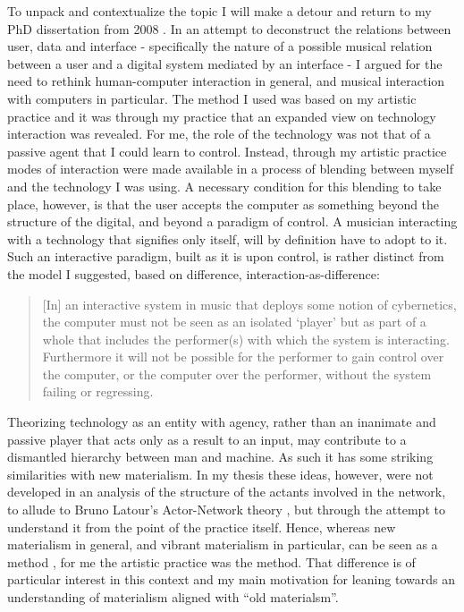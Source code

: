 \documentclass[11pt,a4paper]{article}
\begin{document}
To unpack and contextualize the topic I will make a detour and return to my PhD dissertation from 2008 \citep{frisk08phd}. In an attempt to deconstruct the relations between user, data and interface - specifically the nature of a possible musical relation between a user and a digital system mediated by an interface - I argued for the need to rethink human-computer interaction in general, and musical interaction with computers in particular. The method I used was based on my artistic practice and it was through my practice that an expanded view on technology interaction was revealed. For me, the role of the technology was not that of a passive agent that I could learn to control. Instead, through my artistic practice modes of interaction were made available in a process of blending between myself and the technology I was using.
A necessary condition for this blending to take place, however, is that the user accepts the computer as something beyond the structure of the digital, and beyond a paradigm of control. A musician interacting with a technology that signifies only itself, will by definition have to adopt to it. Such an interactive paradigm, built as it is upon control, is rather distinct from the model I suggested, based on difference, interaction-as-difference:
\begin{quote}
  [In] an interactive system in music that deploys some notion of cybernetics, the computer must not be seen as an isolated ‘player’ but as part of a whole that includes the performer(s) with which the system is interacting. Furthermore it will not be possible for the performer to gain control over the computer, or the computer over the performer, without the system failing or regressing. \citep[p. 98]{frisk08phd}
\end{quote}


Theorizing technology as an entity with agency, rather than an inanimate and passive player that acts only as a result to an input, may contribute to a dismantled hierarchy between man and machine. As such it has some striking similarities with new materialism. In my thesis these ideas, however, were not developed in an analysis of the structure of the actants involved in the network, to allude to Bruno Latour's Actor-Network theory \citep{latour2007}, but through the attempt to understand it from the point of the practice itself. Hence, whereas new materialism in general, and vibrant materialism \citep[][]{bennett2009} in particular, can be seen as a method \citep[p. 23]{joselit2016}, for me the artistic practice was the method. That difference is of particular interest in this context and my main motivation for leaning towards an understanding of materialism aligned with ``old materialsm''.
\end{document}
